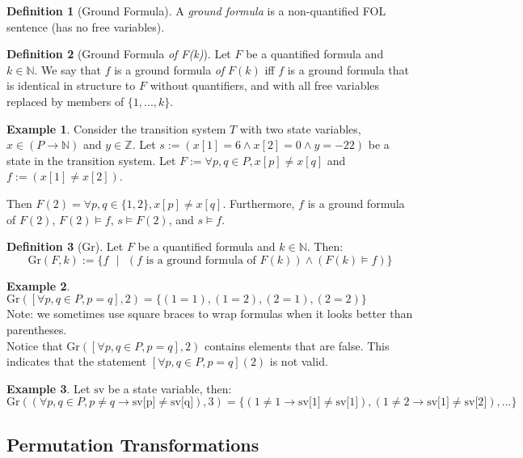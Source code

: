 \documentclass[12pt]{article}
\theoremstyle{definition}
\newtheorem{definition}{Definition}
\newtheorem{example}{Example}
\theoremstyle{remark}
\newcommand{\st}{\text{ }|\text{ }}
\newcommand{\gr}{\text{Gr}}
\begin{document}
\begin{definition}[Ground Formula]
  A \textit{ground formula} is a non-quantified FOL sentence (has no free variables).
\end{definition}

\begin{definition}[Ground Formula \textit{of F(k)}]
  Let $F$ be a quantified formula and $k \in \mathbb{N}$.  We say that $f$ is a ground formula \textit{of} $F(k)$ iff $f$ is a ground formula that is identical in structure to $F$ without quantifiers, and with all free variables replaced by members of $\{1,...,k\}$.
\end{definition}

\begin{example}
  Consider the transition system $T$ with two state variables, $x \in (P \to \mathbb{N})$ and $y \in \mathbb{Z}$.  Let $s := (x[1]=6 \land x[2]=0 \land y=-22)$ be a state in the transition system.  Let $F := \forall p,q \in P, x[p] \neq x[q]$ and $f := (x[1] \neq x[2])$.

  Then $F(2) = \forall p,q \in \{1,2\}, x[p] \neq x[q]$.  Furthermore, $f$ is a ground formula of $F(2)$, $F(2) \models f$, $s \models F(2)$, and $s \models f$.
\end{example}

\begin{definition}[Gr]
  Let $F$ be a quantified formula and $k \in \mathbb{N}$.  Then:
  $$\gr(F,k) := \{f \st (f \text{ is a ground formula of } F(k)) \land (F(k) \models f)\}$$
\end{definition}

\begin{example}
  $\gr([\forall p,q \in P, p=q],2) = \{(1=1),(1=2),(2=1),(2=2)\}$\\
  Note: we sometimes use square braces to wrap formulas when it looks better than parentheses.\\
  Notice that $\gr([\forall p,q \in P, p=q],2)$ contains elements that are false.  This indicates that the statement $[\forall p,q \in P, p=q](2)$ is not valid.
\end{example}
\begin{example}
  Let $\text{sv}$ be a state variable, then:
  $$\gr((\forall p,q \in P, p \neq q \rightarrow \text{sv[p]} \neq \text{sv[q]}),3) = \{(1 \neq 1 \rightarrow \text{sv[1]} \neq \text{sv[1]}),(1 \neq 2 \rightarrow \text{sv[1]} \neq \text{sv[2]}),...\}$$
\end{example}

\subsection{Permutation Transformations}
\end{document}
